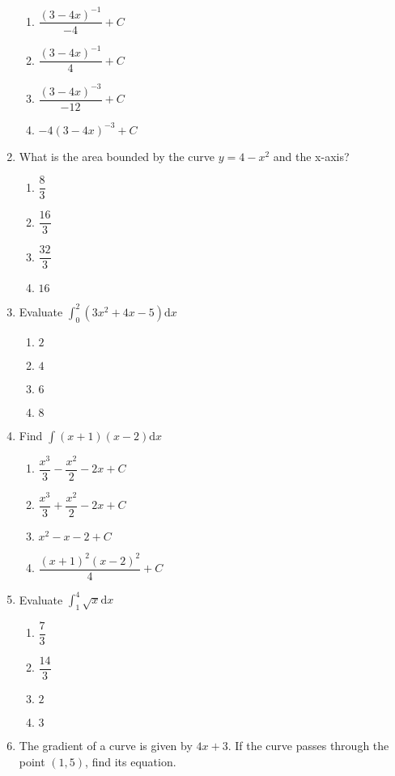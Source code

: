 \begin{multicols}{2}
\begin{enumerate}[label={\arabic*.}]
\begin{enumerate}[label={\Alph*.}]
        \item \(\dfrac{(3-4x)^{-1}}{-4} + C\) %
        \item \(\dfrac{(3-4x)^{-1}}{4} + C\)
        \item \(\dfrac{(3-4x)^{-3}}{-12} + C\)
        \item \(-4(3-4x)^{-3} + C\)
      \end{enumerate}
    \item What is the area bounded by the curve \(y=4-x^2\) and the x-axis?
      \begin{enumerate}[label={\Alph*.}]
        \item \(\dfrac{8}{3}\)
        \item \(\dfrac{16}{3}\)
        \item \(\dfrac{32}{3}\)
        \item \(16\)
      \end{enumerate}
    \item Evaluate \(\displaystyle \int_{0}^{2} (3x^2+4x-5) \mathrm{d}x\)
      \begin{enumerate}[label={\Alph*.}]
        \item \(2\)
        \item \(4\)
        \item \(6\)
        \item \(8\)
      \end{enumerate}
    \item Find \(\displaystyle \int (x+1)(x-2) \mathrm{d}x\)
      \begin{enumerate}[label={\Alph*.}]
        \item \(\dfrac{x^3}{3} - \dfrac{x^2}{2} - 2x + C\)
        \item \(\dfrac{x^3}{3} + \dfrac{x^2}{2} - 2x + C\)
        \item \(x^2 - x - 2 + C\)
        \item \(\dfrac{(x+1)^2(x-2)^2}{4} + C\)
      \end{enumerate}
    \item Evaluate \(\displaystyle \int_{1}^{4} \sqrt{x} \mathrm{d}x\)
      \begin{enumerate}[label={\Alph*.}]
        \item \(\dfrac{7}{3}\)
        \item \(\dfrac{14}{3}\)
        \item \(2\)
        \item \(3\)
      \end{enumerate}
    \item The gradient of a curve is given by \(4x+3\). If the curve passes through the point \((1,5)\), find its equation.

\end{enumerate}
\end{multicols}
